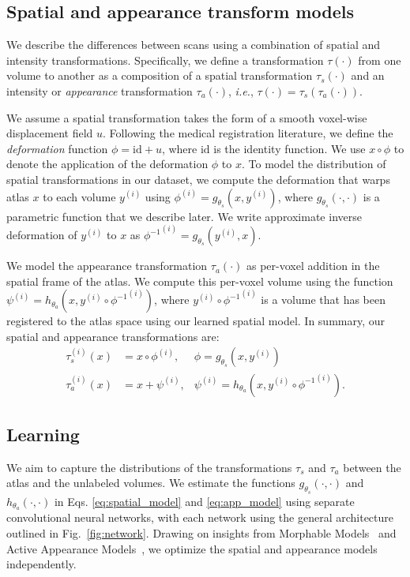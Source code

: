 \documentclass[10pt,twocolumn,letterpaper]{article}
\newcommand{\id}{\mathrm{id}}
\begin{document}
\subsection{Spatial and appearance transform models}\label{sec:transform_models}
We describe the differences between scans using a combination of spatial and intensity transformations. Specifically, we define a transformation $\tau(\cdot)$ from one volume to another as a composition of a spatial transformation $\tau_{s}(\cdot)$ and an intensity or \textit{appearance} transformation $\tau_{a}(\cdot)$, \textit{i.e.}, $\tau(\cdot) = \tau_s(\tau_a(\cdot))$. 




We assume a spatial transformation takes the form of a smooth voxel-wise displacement field $u$. Following the medical registration literature, we define the \textit{deformation} function $\phi = \id + u$, where $\id$ is the identity function. We use $x \circ \phi$ to denote the application of the deformation $\phi$ to $x$. To model the distribution of spatial transformations in our dataset, we compute the deformation that warps atlas $x$ to each volume $y^{(i)}$ using $\phi^{(i)} = g_{\theta_s}(x, y^{(i)})$, where $g_{\theta_s}(\cdot, \cdot)$ is a parametric function that we describe later.  We write approximate inverse deformation of $y^{(i)}$ to $x$ as ${\phi^{-1}}^{(i)} = g_{\theta_s}(y^{(i)},x)$. 

We model the appearance transformation $\tau_a(\cdot)$ as per-voxel addition in the spatial frame of the atlas. We compute this per-voxel volume using the function \mbox{$\psi^{(i)} = h_{\theta_a}(x, y^{(i)} \circ {\phi^{-1}}^{(i)})$}, where $y^{(i)} \circ {\phi^{-1}}^{(i)}$ is a volume that has been registered to the atlas space using our learned spatial model. 
In summary, our spatial and appearance transformations are:
\vspace{-1pt}
\begin{align}
\tau^{(i)}_s(x) &= x \circ \phi^{(i)}, &\phi=g_{\theta_s}(x, y^{(i)}) \label{eq:spatial_model}\\
\tau^{(i)}_a(x) &= x + \psi^{(i)}, &\psi^{(i)} = h_{\theta_a}(x, y^{(i)}\circ {\phi^{-1}}^{(i)}).\label{eq:app_model}
\end{align}






\subsection{Learning}
We aim to capture the distributions of the transformations $\tau_s$ and $\tau_a$ between the atlas and the unlabeled volumes. We estimate the functions $g_{\theta_s}(\cdot, \cdot)$ and $h_{\theta_a}(\cdot, \cdot)$ in Eqs. \eqref{eq:spatial_model} and \eqref{eq:app_model} using separate convolutional neural networks, with each network using the general architecture outlined in Fig.~\ref{fig:network}. Drawing on insights from Morphable Models~\cite{jones1998multidimensional} and Active Appearance Models~\cite{cootes2001active,cootes2001statistical}, we optimize the spatial and appearance models independently. 
\end{document}
